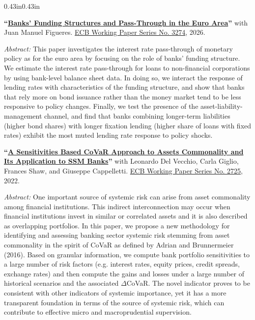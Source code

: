 \documentclass[10pt,a4paper]{article}
\newenvironment{cvbody}
  {\begin{adjustwidth}{0.43in}{0.43in}}
  {\end{adjustwidth}}
\newcommand{\paper}[3]{%
  \textbf{``#1''}#2\par
  \vspace{3pt}
  {\fontsize{8.3}{9.6}\selectfont\textit{Abstract:} #3\par}
  \vspace{6pt}
}
\begin{document}
\begin{cvbody}

  \paper{\href{https://www.ecb.europa.eu/pub/pdf/scpwps/ecb.wp3274~c747d7b2d0.en.pdf}{Banks' Funding Structures and Pass-Through in the Euro Area}}{ with Juan Manuel Figueres. \href{https://www.ecb.europa.eu/pub/pdf/scpwps/ecb.wp3274~c747d7b2d0.en.pdf}{ECB Working Paper Series No. 3274}, 2026.}{This paper investigates the interest rate pass-through of monetary policy as for the euro area by focusing on the role of banks' funding structure. We estimate the interest rate pass-through for loans to non-financial corporations by using bank-level balance sheet data. In doing so, we interact the response of lending rates with characteristics of the funding structure, and show that banks that rely more on bond issuance rather than the money market tend to be less responsive to policy changes. Finally, we test the presence of the asset-liability-management channel, and find that banks combining longer-term liabilities (higher bond shares) with longer fixation lending (higher share of loans with fixed rates) exhibit the most muted lending rate response to policy shocks.}

\vspace{4pt}
 
  \paper{\href{https://www.ecb.europa.eu/pub/pdf/scpwps/ecb.wp2725~8ecb5a7ea3.en.pdf}{A Sensitivities Based CoVaR Approach to Assets Commonality and Its Application to SSM Banks}}{ with Leonardo Del Vecchio, Carla Giglio, Frances Shaw, and Giuseppe Cappelletti. \href{https://www.ecb.europa.eu/pub/pdf/scpwps/ecb.wp2725~8ecb5a7ea3.en.pdf}{ECB Working Paper Series No. 2725}, 2022.}{ One important source of systemic risk can arise from asset commonality among financial institutions. This indirect interconnection may occur when financial institutions invest in similar or correlated assets and it is also described as overlapping portfolios. In this paper, we propose a new methodology for identifying and assessing banking sector systemic risk stemming from asset commonality in the spirit of CoVaR as defined by Adrian and Brunnermeier (2016). Based on granular information, we compute bank portfolio sensitivities to a large number of risk factors (e.g. interest rates, equity prices, credit spreads, exchange rates) and then compute the gains and losses under a large number of historical scenarios and the associated $\Delta$CoVaR. The novel indicator proves to be consistent with other indicators of systemic importance, yet it has a more transparent foundation in terms of the source of systemic risk, which can contribute to effective micro and macroprudential supervision. }

\end{cvbody}
\end{document}
